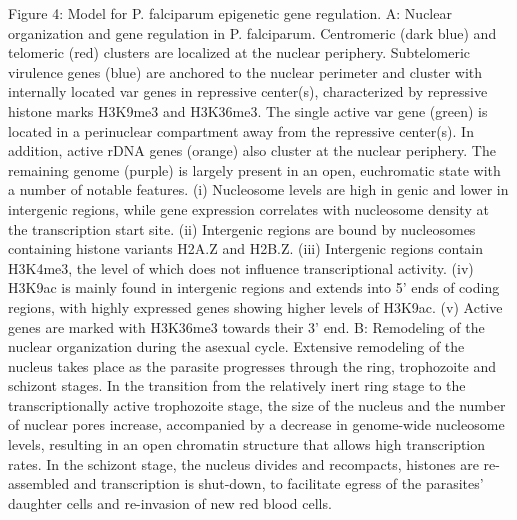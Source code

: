  Figure 4: Model for P. falciparum epigenetic gene regulation.
 A: Nuclear organization and gene regulation in P. falciparum. Centromeric
 (dark blue) and telomeric (red) clusters are localized at the nuclear
 periphery. Subtelomeric virulence genes (blue) are anchored to the nuclear
 perimeter and cluster with internally located var genes in repressive
 center(s), characterized by repressive histone marks H3K9me3 and H3K36me3.
 The single active var gene (green) is located in a perinuclear compartment
 away from the repressive center(s). In addition, active rDNA genes (orange)
 also cluster at the nuclear periphery. The remaining genome (purple) is
 largely present in an open, euchromatic state with a number of notable
 features. (i) Nucleosome levels are high in genic and lower in intergenic
 regions, while gene expression correlates with nucleosome density at the
 transcription start site. (ii) Intergenic regions are bound by nucleosomes
 containing histone variants H2A.Z and H2B.Z. (iii) Intergenic regions contain
 H3K4me3, the level of which does not influence transcriptional activity. (iv)
 H3K9ac is mainly found in intergenic regions and extends into 5’ ends of
 coding regions, with highly expressed genes showing higher levels of H3K9ac.
 (v) Active genes are marked with H3K36me3 towards their 3’ end. B: Remodeling
 of the nuclear organization during the asexual cycle. Extensive remodeling of
 the nucleus takes place as the parasite progresses through the ring,
 trophozoite and schizont stages. In the transition from the relatively inert
 ring stage to the transcriptionally active trophozoite stage, the size of the
 nucleus and the number of nuclear pores increase, accompanied by a decrease
 in genome-wide nucleosome levels, resulting in an open chromatin structure
 that allows high transcription rates. In the schizont stage, the nucleus
 divides and recompacts, histones are re-assembled and transcription is
 shut-down, to facilitate egress of the parasites’ daughter cells and
 re-invasion of new red blood cells.


